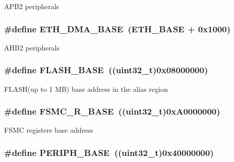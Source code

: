 A\-P\-B2 peripherals \hypertarget{group___peripheral__memory__map_gace2114e1b37c1ba88d60f3e831b67e93}{
\subsubsection[{E\-T\-H\-\_\-\-D\-M\-A\-\_\-\-B\-A\-S\-E}]{\setlength{\rightskip}{0pt plus 5cm}\#define E\-T\-H\-\_\-\-D\-M\-A\-\_\-\-B\-A\-S\-E~(E\-T\-H\-\_\-\-B\-A\-S\-E + 0x1000)}}\label{group___peripheral__memory__map_gace2114e1b37c1ba88d60f3e831b67e93}
A\-H\-B2 peripherals \hypertarget{group___peripheral__memory__map_ga23a9099a5f8fc9c6e253c0eecb2be8db}{
\subsubsection[{F\-L\-A\-S\-H\-\_\-\-B\-A\-S\-E}]{\setlength{\rightskip}{0pt plus 5cm}\#define F\-L\-A\-S\-H\-\_\-\-B\-A\-S\-E~((uint32\-\_\-t)0x08000000)}}\label{group___peripheral__memory__map_ga23a9099a5f8fc9c6e253c0eecb2be8db}
F\-L\-A\-S\-H(up to 1 M\-B) base address in the alias region \hypertarget{group___peripheral__memory__map_gaddf0e199dccba83272b20c9fb4d3aaed}{
\subsubsection[{F\-S\-M\-C\-\_\-\-R\-\_\-\-B\-A\-S\-E}]{\setlength{\rightskip}{0pt plus 5cm}\#define F\-S\-M\-C\-\_\-\-R\-\_\-\-B\-A\-S\-E~((uint32\-\_\-t)0x\-A0000000)}}\label{group___peripheral__memory__map_gaddf0e199dccba83272b20c9fb4d3aaed}
F\-S\-M\-C registers base address \hypertarget{group___peripheral__memory__map_ga9171f49478fa86d932f89e78e73b88b0}{
\subsubsection[{P\-E\-R\-I\-P\-H\-\_\-\-B\-A\-S\-E}]{\setlength{\rightskip}{0pt plus 5cm}\#define P\-E\-R\-I\-P\-H\-\_\-\-B\-A\-S\-E~((uint32\-\_\-t)0x40000000)}}\label{group___peripheral__memory__map_ga9171f49478fa86d932f89e78e73b88b0}
